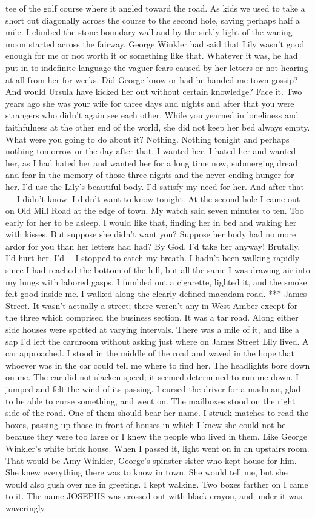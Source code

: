 \documentclass{novel}
\begin{document}
tee of the golf course where it angled toward the road. As kids we used to take a short cut diagonally across the course to the second hole, saving perhaps half a mile. I climbed the stone boundary wall and by the sickly light of the waning moon started across the fairway. George Winkler had said that Lily wasn’t good enough for me or not worth it or something like that. Whatever it was, he had put in to indefinite language the vaguer fears caused by her letters or not hearing at all from her for weeks. Did George know or had he handed me town gossip? And would Ursula have kicked her out without certain knowledge? Face it. Two years ago she was your wife for three days and nights and after that you were strangers who didn’t again see each other. While you yearned in loneliness and faithfulness at the other end of the world, she did not keep her bed always empty. What were you going to do about it? Nothing. Nothing tonight and perhaps nothing tomorrow or the day after that. I wanted her. I hated her and wanted her, as I had hated her and wanted her for a long time now, submerging dread and fear in the memory of those three nights and the never-ending hunger for her. I’d use the Lily’s beautiful body. I’d satisfy my need for her. And after that— I didn’t know. I didn’t want to know tonight. At the second hole I came out on Old Mill Road at the edge of town. My watch said seven minutes to ten. Too early for her to be asleep. I would like that, finding her in bed and waking her with kisses. But suppose she didn’t want you? Suppose her body had no more ardor for you than her letters had had? By God, I’d take her anyway! Brutally. I’d hurt her. I’d— I stopped to catch my breath. I hadn’t been walking rapidly since I had reached the bottom of the hill, but all the same I was drawing air into my lungs with labored gasps. I fumbled out a cigarette, lighted it, and the smoke felt good inside me. I walked along the clearly defined macadam road. *** James Street. It wasn’t actually a street; there weren’t any in West Amber except for the three which comprised the business section. It was a tar road. Along either side houses were spotted at varying intervals. There was a mile of it, and like a sap I’d left the cardroom without asking just where on James Street Lily lived. A car approached. I stood in the middle of the road and waved in the hope that whoever was in the car could tell me where to find her. The headlights bore down on me. The car did not slacken speed; it seemed determined to run me down. I jumped and felt the wind of its passing. I cursed the driver for a madman, glad to be able to curse something, and went on. The mailboxes stood on the right side of the road. One of them should bear her name. I struck matches to read the boxes, passing up those in front of houses in which I knew she could not be because they were too large or I knew the people who lived in them. Like George Winkler’s white brick house. When I passed it, light went on in an upstairs room. That would be Amy Winkler, George’s spinster sister who kept house for him. She knew everything there was to know in town. She would tell me, but she would also gush over me in greeting. I kept walking. Two boxes farther on I came to it. The name JOSEPHS was crossed out with black crayon, and under it was waveringly 
\end{document}
